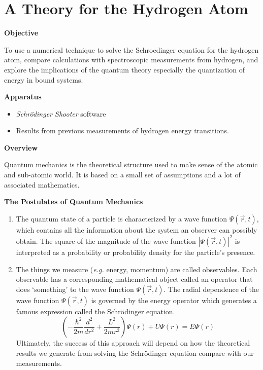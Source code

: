 \section{A Theory for the Hydrogen Atom}

\makelabheader %

\textbf{Objective}

To use a numerical technique to solve the Schroedinger equation for the hydrogen atom,
compare calculations with spectroscopic measurements from hydrogen,
 and explore
the implications of the quantum theory especially the quantization of energy
in bound systems.

\textbf{Apparatus}

\begin{itemize}

\item {\it Schr\"odinger Shooter} software

\item Results from previous measurements of hydrogen energy transitions.

\end{itemize}

\textbf{Overview}

Quantum mechanics is the theoretical structure used to make sense of the atomic and sub-atomic
world. 
It is based on a small set of assumptions and a lot of associated mathematics.

\begin{center}
\bf The Postulates of Quantum Mechanics
\end{center}

\begin{enumerate}

\item The quantum state of a particle is characterized by a wave function  
$\Psi(\vec r,t)$, which contains all the information about the system an observer can 
possibly obtain.
The square of the magnitude of the wave function $|\Psi (\vec r,t)|^2$ 
is interpreted as a probability or probability density for the particle's presence. 

\item The things we measure ({\it e.g.} energy, momentum) are called observables. 
Each observable has a corresponding mathematical object called an operator 
that does `something' to the wave function $\Psi(\vec r,t)$.
The radial dependence of the wave function $\Psi(\vec r,t)$ is governed by
the energy operator which generates a famous expression called the
Schr\"odinger equation.
\begin{equation}
\left (-\frac{\hbar^2}{2 m} \frac{d^2}{d r^2} +  
   \frac{L^2}{2 m r^2} \right ) \Psi(r) + U \Psi(r) = E  \Psi(r)
\end{equation}
Ultimately, the success of this approach will depend on how the theoretical
results we generate from solving the Schr\"odinger equation compare with
our measurements.

\end{enumerate}

